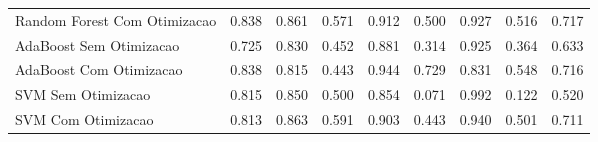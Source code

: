 \begin{table}[H]
\begin{adjustwidth}{ -1in }{ -1in }
\begin{tabular}{lrrrrrrrr}
      Random Forest Com Otimizacao &                        0.838 &                         0.861 &                            0.571 &                            0.912 &                          0.500 &                          0.927 &                                     0.516 &                                 0.717 \\
           AdaBoost Sem Otimizacao &                        0.725 &                         0.830 &                            0.452 &                            0.881 &                          0.314 &                          0.925 &                                     0.364 &                                 0.633 \\
           AdaBoost Com Otimizacao &                        0.838 &                         0.815 &                            0.443 &                            0.944 &                          0.729 &                          0.831 &                                     0.548 &                                 0.716 \\
                SVM Sem Otimizacao &                        0.815 &                         0.850 &                            0.500 &                            0.854 &                          0.071 &                          0.992 &                                     0.122 &                                 0.520 \\
                SVM Com Otimizacao &                        0.813 &                         0.863 &                            0.591 &                            0.903 &                          0.443 &                          0.940 &                                     0.501 &                                 0.711 \\
\bottomrule
\end{tabular}
    \end{adjustwidth}
    \renewcommand{\arraystretch}{1.0} %
\end{table}
